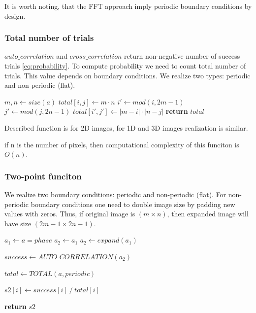 \documentclass[reprint,amsmath,amssymb,aps,pre,showkeys,showpacs,nofootinbib]{revtex4-1}
\begin{document}
It is worth noting, that the FFT approach imply
periodic boundary conditions by design.

\subsubsection{Total number of trials}

$auto\_correlation$ and $cross\_correlation$ return non-negative number
of success trials \cref{eq:probability}.
To compute probability we need to count total number of trials.
This value depends on boundary conditions.
We realize two types: periodic and non-periodic (flat).

\begin{algorithmic}[1]
    \State $m, n \gets size(a)$
          \State $total[i, j] \gets m \cdot n$
        \EndFor
      \EndFor
    \Else
          \State $i' \gets mod(i, 2m - 1)$
          \State $j' \gets mod(j, 2n - 1)$
          \State $total[i', j'] \gets |m - i| \cdot |n - j|$
        \EndFor
      \EndFor
    \EndIf
    \State \textbf{return} $total$
  \EndProcedure
\end{algorithmic}

Described function is for 2D images,
for 1D and 3D images realization is similar.

if n is the number of pixels, then computational complexity
of this funciton is $O(n)$.

\subsubsection{Two-point funciton}

We realize two boundary conditions: periodic and non-periodic (flat).
For non-periodic boundary conditions one need to double image size
by padding new values with zeros.
Thus, if original image is $(m \times n)$,
then expanded image will have size $(2m - 1 \times 2n - 1)$.

\begin{algorithmic}[1]
    \State $a_1 \gets a = phase$
      \State $a_2 \gets a_1$
    \Else
      \State $a_2 \gets expand(a_1)$
    \EndIf
    
    \State $success \gets AUTO\_CORRELATION(a_2)$

    \State $total \gets TOTAL(a, periodic)$

      \State $s2[i] \gets success[i]\ /\ total[i]$
    \EndFor
    
    \State \textbf{return} $s2$
  \EndProcedure
\end{algorithmic} 
\end{document}
